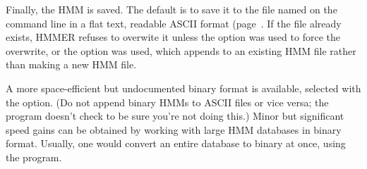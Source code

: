 Finally, the HMM is saved. The default is to save it to the file named
on the  command line in a flat text, readable ASCII
format (page~\pageref{section:savefiles}. If the file already exists,
HMMER refuses to overwite it unless the  option was used to
force the overwrite, or the  option was used, which appends
to an existing HMM file rather than making a new HMM file.

A more space-efficient but undocumented binary format is available,
selected with the  option. (Do not append binary HMMs
to ASCII files or vice versa; the program doesn't check to be sure
you're not doing this.) Minor but significant speed gains can be
obtained by working with large HMM databases in binary
format. Usually, one would convert an entire database to binary at
once, using the  program.




